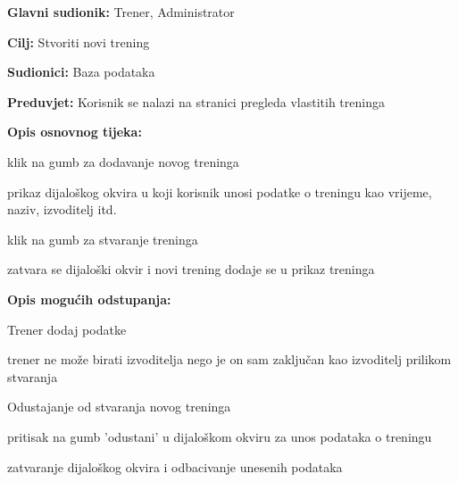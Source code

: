 					
					\noindent {}
					\begin{packed_item}
	
						\item \textbf{Glavni sudionik: }Trener, Administrator
						\item  \textbf{Cilj: } Stvoriti novi trening
						\item  \textbf{Sudionici: } Baza podataka
						\item  \textbf{Preduvjet: } Korisnik se nalazi na stranici pregleda vlastitih treninga
						\item  \textbf{Opis osnovnog tijeka:}
						
						\item[] \begin{packed_enum}
	
							\item klik na gumb za dodavanje novog treninga
							\item prikaz dijaloškog okvira u koji korisnik unosi podatke o treningu kao vrijeme, naziv, izvoditelj itd.
							\item klik na gumb za stvaranje treninga
							\item zatvara se dijaloški okvir i novi trening dodaje se u prikaz treninga
							
						\end{packed_enum}
						
						\item  \textbf{Opis mogućih odstupanja:}
						
						\item[] \begin{packed_item}
	
							\item[2.a]Trener dodaj podatke
							\item[] \begin{packed_enum}
								
								\item trener ne može birati izvoditelja nego je on sam zaključan kao izvoditelj prilikom stvaranja
								
								
							\end{packed_enum}
						
						
							\item[3.a] Odustajanje od stvaranja novog treninga
							\item[] \begin{packed_enum}
								
								\item pritisak na gumb 'odustani' u dijaloškom okviru za unos podataka o treningu
								\item zatvaranje dijaloškog okvira i odbacivanje unesenih podataka
								
							\end{packed_enum}
						
						
							
						\end{packed_item}
					\end{packed_item}
				

